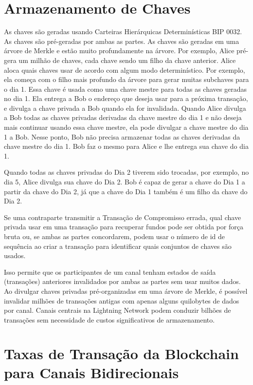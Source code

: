 \documentclass[letterpaper,11pt]{article}
\begin{document}
\section{Armazenamento de Chaves}

As chaves são geradas usando Carteiras Hierárquicas Determinísticas BIP
0032\cite{bip32}. As chaves são pré-geradas por ambas as partes. As chaves
são geradas em uma árvore de Merkle e estão muito profundamente na árvore.
Por exemplo, Alice pré-gera um milhão de chaves, cada chave sendo um filho
da chave anterior. Alice aloca quais chaves usar de acordo com algum modo
determinístico. Por exemplo, ela começa com o filho mais profundo da árvore
para gerar muitas subchaves para o dia 1. Essa chave é usada como uma chave
mestre para todas as chaves geradas no dia 1. Ela entrega a Bob o endereço
que deseja usar para a próxima transação, e divulga a chave privada a Bob
quando ela for invalidada. Quando Alice divulga a Bob todas as chaves
privadas derivadas da chave mestre do dia 1 e não deseja mais continuar
usando essa chave mestre, ela pode divulgar a chave mestre do dia 1 a Bob.
Nesse ponto, Bob não precisa armazenar todas as chaves derivadas da chave
mestre do dia 1. Bob faz o mesmo para Alice e lhe entrega sua chave do
dia 1.

Quando todas as chaves privadas do Dia 2 tiverem sido trocadas, por
exemplo, no dia 5, Alice divulga sua chave do Dia 2. Bob é capaz de gerar
a chave do Dia 1 a partir da chave do Dia 2, já que a chave do Dia 1
também é um filho da chave do Dia 2.

Se uma contraparte transmitir a Transação de Compromisso errada, qual chave
privada usar em uma transação para recuperar fundos pode ser obtida por
força bruta ou, se ambas as partes concordarem, podem usar o número de id
de sequência ao criar a transação para identificar quais conjuntos de
chaves são usados.

Isso permite que os participantes de um canal tenham estados de saída
(transações) anteriores invalidados por ambas as partes sem usar muitos
dados. Ao divulgar chaves privadas pré-organizadas em uma árvore de
Merkle, é possível invalidar milhões de transações antigas com apenas
alguns quilobytes de dados por canal. Canais centrais na Lightning Network
podem conduzir bilhões de transações sem necessidade de custos
significativos de armazenamento.

\section{Taxas de Transação da Blockchain para Canais Bidirecionais}
\end{document}
